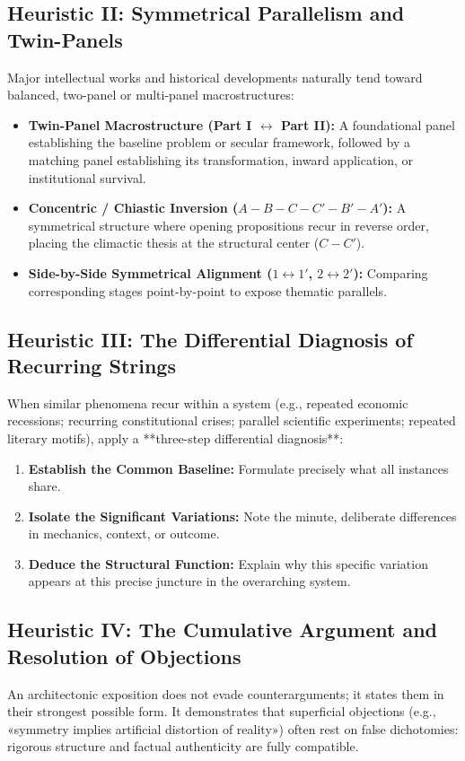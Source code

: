\documentclass[11pt,letterpaper]{article}
\begin{document}
\subsection{Heuristic II: Symmetrical Parallelism and Twin-Panels}
Major intellectual works and historical developments naturally tend toward balanced, two-panel or multi-panel macrostructures:
\begin{itemize}
  \item \textbf{Twin-Panel Macrostructure (Part I $\longleftrightarrow$ Part II):} A foundational panel establishing the baseline problem or secular framework, followed by a matching panel establishing its transformation, inward application, or institutional survival.
  \item \textbf{Concentric / Chiastic Inversion ($A - B - C - C' - B' - A'$):} A symmetrical structure where opening propositions recur in reverse order, placing the climactic thesis at the structural center ($C - C'$).
  \item \textbf{Side-by-Side Symmetrical Alignment ($1 \leftrightarrow 1'$, $2 \leftrightarrow 2'$):} Comparing corresponding stages point-by-point to expose thematic parallels.
\end{itemize}

\subsection{Heuristic III: The Differential Diagnosis of Recurring Strings}
When similar phenomena recur within a system (e.g., repeated economic recessions; recurring constitutional crises; parallel scientific experiments; repeated literary motifs), apply a **three-step differential diagnosis**:
\begin{enumerate}
  \item \textbf{Establish the Common Baseline:} Formulate precisely what all instances share.
  \item \textbf{Isolate the Significant Variations:} Note the minute, deliberate differences in mechanics, context, or outcome.
  \item \textbf{Deduce the Structural Function:} Explain why this specific variation appears at this precise juncture in the overarching system.
\end{enumerate}

\subsection{Heuristic IV: The Cumulative Argument and Resolution of Objections}
An architectonic exposition does not evade counterarguments; it states them in their strongest possible form. It demonstrates that superficial objections (e.g., «symmetry implies artificial distortion of reality») often rest on false dichotomies: rigorous structure and factual authenticity are fully compatible.
\end{document}
